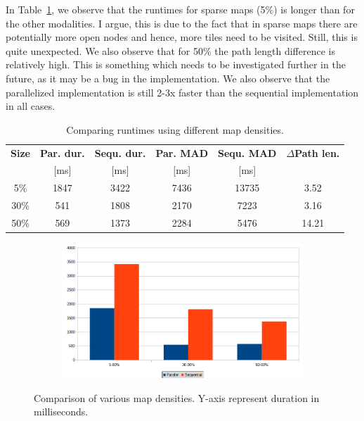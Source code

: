 \documentclass{article}
\begin{document}
In Table~\ref{tab:map_impact}, we observe that the runtimes for sparse maps (5\%) is longer than for the other modalities. I argue, this is due to the fact that in sparse maps there are potentially more open nodes and hence, more tiles need to be visited. Still, this is quite unexpected. We also observe that for 50\% the path length difference is relatively high. This is something which needs to be investigated further in the future, as it may be a bug in the implementation. We also observe that the parallelized implementation is still 2-3x faster than the sequential implementation in all cases.
%
\begin{table}[]
    \centering
    \begin{tabular}{|c|c|c|c|c|c|}
        \hline
        \textbf{Size} & \textbf{Par. dur.} & \textbf{Sequ. dur.} & \textbf{Par. MAD} & \textbf{Sequ. MAD} & \textbf{$\Delta$Path len.} \\
        &[ms] & [ms] & [ms] & [ms] & \\
        \hline
        5\% & 1847 & 3422 & 7436 & 13735 & 3.52 \\
        \hline
        30\% & 541 & 1808 & 2170 & 7223 & 3.16 \\
        \hline
        50\% & 569 & 1373 & 2284 & 5476 & 14.21 \\
        \hline
    \end{tabular}
    \caption{Comparing runtimes using different map densities.}
    \label{tab:map_impact}
\end{table}
%
\begin{figure}[h]
    \centering
    \begin{subfigure}[b]{1.0\textwidth}
        \centering
        \includegraphics[width=\textwidth]{figures/map_density.png}
    \end{subfigure}
    \hfill
    \caption{Comparison of various map densities. Y-axis represent duration in milliseconds. }
    \label{fig:map_density}
\end{figure}
%
\end{document}
